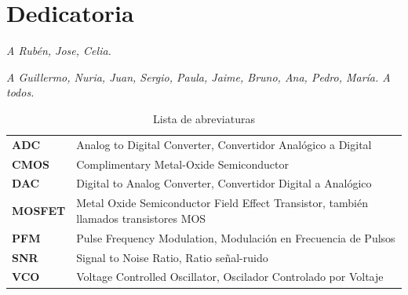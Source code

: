 \documentclass[12pt]{report} %
\begin{document}
\chapter*{Dedicatoria}

\setcounter{page}{5}
	
	\begin{center}
		\textit{A Rubén, Jose, Celia.}
	\end{center}

	\begin{center}
		\textit{A Guillermo, Nuria, Juan, Sergio, Paula, Jaime, Bruno, Ana, Pedro, María. A todos.}
	\end{center}
	\vfill
	
	\newpage %
	\thispagestyle{empty}
	\mbox{}
	


\tableofcontents
\thispagestyle{fancy}


\listoffigures
\thispagestyle{fancy}


\listoftables
\thispagestyle{fancy}


\newpage
\begin{table}[h!]
	\setlength{\arrayrulewidth}{0mm}
	\begin{center}
		\caption{Lista de abreviaturas}
		\label{tab:table1}
		\begin{tabular}{>{\bf}p{4cm}|p{10cm}}
			ADC & Analog to Digital Converter, Convertidor Analógico a Digital \\
			CMOS & Complimentary Metal-Oxide Semiconductor \\
			DAC & Digital to Analog Converter, Convertidor Digital a Analógico \\
			MOSFET & Metal Oxide Semiconductor Field Effect Transistor, también llamados transistores MOS \\
			PFM & Pulse Frequency Modulation, Modulación en Frecuencia de Pulsos \\
			SNR & Signal to Noise Ratio, Ratio señal-ruido \\
			VCO & Voltage Controlled Oscillator, Oscilador Controlado por Voltaje \\
		\end{tabular}
	\end{center}
\end{table}
\end{document}
